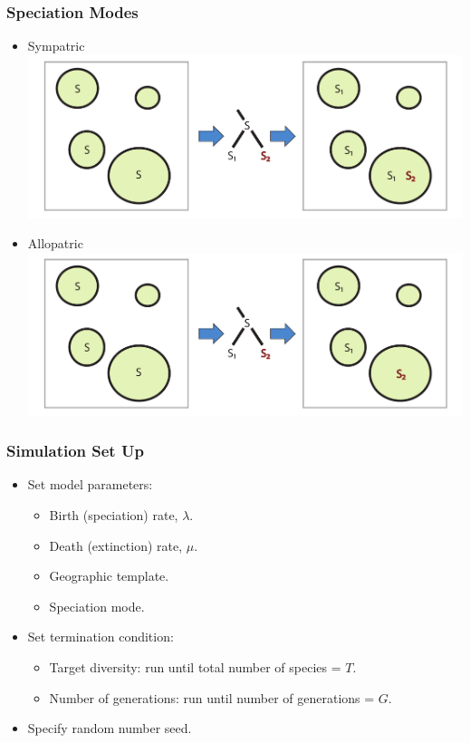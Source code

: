 \documentclass[11pt,t]{beamer}
\begin{document}
\begin{frame}
	\frametitle{Speciation Modes}
	\begin{itemize}
		\item Sympatric \\
			\includegraphics[scale=0.3]{sympatric-speciation.pdf}
		\item Allopatric \\
			\includegraphics[scale=0.3]{allopatric-speciation.pdf}			
	\end{itemize}
\end{frame}

\begin{frame}
	\frametitle{Simulation Set Up}		
		\begin{itemize}
			\item Set model parameters:
				\begin{itemize}
					\item Birth (speciation) rate, $\lambda$.
					\item Death (extinction) rate, $\mu$.
					\item Geographic template.
					\item Speciation mode.
				\end{itemize}				
		   \item Set termination condition:
				\begin{itemize}
					\item Target diversity: run until total number of species = $T$.
					\item Number of generations: run until number of generations = $G$.
				\end{itemize}						
			\item Specify random number seed.							
		\end{itemize}									
\end{frame}
\end{document}

